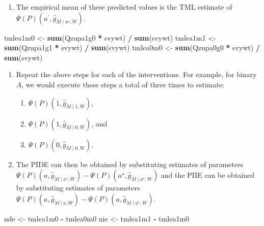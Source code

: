 \documentclass[
  12pt, krantz2,
]{book}
\makeatletter
\newenvironment{Shaded}{\begin{snugshade}}{\end{snugshade}}
\newcommand{\KeywordTok}[1]{\textcolor[rgb]{0.13,0.29,0.53}{\textbf{#1}}}
\newcommand{\NormalTok}[1]{#1}
\newcommand{\OperatorTok}[1]{\textcolor[rgb]{0.81,0.36,0.00}{\textbf{#1}}}
\newcommand{\StringTok}[1]{\textcolor[rgb]{0.31,0.60,0.02}{#1}}
\providecommand{\tightlist}{%
  \setlength{\itemsep}{0pt}\setlength{\parskip}{0pt}}
\newenvironment{kframe}{%
\medskip{}
\setlength{\fboxsep}{.8em}
 \def\at@end@of@kframe{}%
 \ifinner\ifhmode%
  \def\at@end@of@kframe{\end{minipage}}%
  \begin{minipage}{\columnwidth}%
 \fi\fi%
 \def\FrameCommand##1{\hskip\@totalleftmargin \hskip-\fboxsep
 \colorbox{shadecolor}{##1}\hskip-\fboxsep
     \hskip-\linewidth \hskip-\@totalleftmargin \hskip\columnwidth}%
 \MakeFramed {\advance\hsize-\width
   \@totalleftmargin\z@ \linewidth\hsize
   \@setminipage}}%
 {\par\unskip\endMakeFramed%
 \at@end@of@kframe}
\renewenvironment{Shaded}{\begin{kframe}}{\end{kframe}}
\theoremstyle{definition}
\theoremstyle{definition}
\theoremstyle{definition}
\newcommand{\1}{\mathbbm{1}}
\makeatother
\begin{document}
\begin{enumerate}
\def\labelenumi{\arabic{enumi}.}
\setcounter{enumi}{9}
\tightlist
\item
  The empirical mean of these predicted values is the TML estimate of
  \(\Psi(P)(a^\prime, \hat{g}_{M \mid a^{\star}, W})\).
\end{enumerate}

\begin{Shaded}
\begin{Highlighting}[]
\NormalTok{tmlea1m0 <-}\StringTok{ }\KeywordTok{sum}\NormalTok{(Qzupa1g0 }\OperatorTok{*}\StringTok{ }\NormalTok{svywt) }\OperatorTok{/}\StringTok{ }\KeywordTok{sum}\NormalTok{(svywt)}
\NormalTok{tmlea1m1 <-}\StringTok{ }\KeywordTok{sum}\NormalTok{(Qzupa1g1 }\OperatorTok{*}\StringTok{ }\NormalTok{svywt) }\OperatorTok{/}\StringTok{ }\KeywordTok{sum}\NormalTok{(svywt)}
\NormalTok{tmlea0m0 <-}\StringTok{ }\KeywordTok{sum}\NormalTok{(Qzupa0g0 }\OperatorTok{*}\StringTok{ }\NormalTok{svywt) }\OperatorTok{/}\StringTok{ }\KeywordTok{sum}\NormalTok{(svywt)}
\end{Highlighting}
\end{Shaded}

\begin{enumerate}
\def\labelenumi{\arabic{enumi}.}
\setcounter{enumi}{10}
\tightlist
\item
  Repeat the above steps for each of the interventions. For example, for
  binary \(A\), we would execute these steps a total of three times to
  estimate:

  \begin{enumerate}
  \def\labelenumii{\arabic{enumii}.}
  \tightlist
  \item
    \(\Psi(P)(1,\hat{g}_{M \mid 1, W})\),
  \item
    \(\Psi(P)(1,\hat{g}_{M \mid 0, W})\), and
  \item
    \(\Psi(P)(0,\hat{g}_{M \mid 0, W})\).
  \end{enumerate}
\item
  The PIDE can then be obtained by substituting estimates of parameters
  \(\Psi(P)(a,\hat{g}_{M \mid a^{\star}, W}) - \Psi(P)(a^{\star},\hat{g}_{M \mid a^{\star}, W})\) and the PIIE
  can be obtained by substituting estimates of parameters
  \(\Psi(P)(a,\hat{g}_{M \mid a,W}) - \Psi(P)(a, \hat{g}_{M \mid a^{\star}, W})\).
\end{enumerate}

\begin{Shaded}
\begin{Highlighting}[]
\NormalTok{nde <-}\StringTok{ }\NormalTok{tmlea1m0 }\OperatorTok{-}\StringTok{ }\NormalTok{tmlea0m0}
\NormalTok{nie <-}\StringTok{ }\NormalTok{tmlea1m1 }\OperatorTok{-}\StringTok{ }\NormalTok{tmlea1m0}
\end{Highlighting}
\end{Shaded}
\end{document}
